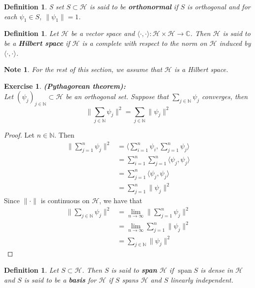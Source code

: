 \documentclass[12pt]{amsart}
\newtheorem{defn}[thm]{Definition}
\newtheorem{note}[thm]{Note}
\newtheorem{ex}[thm]{Exercise}
\renewcommand{\r}{\rangle}
\renewcommand{\l}{\langle}
\newcommand{\C}{\mathbb{C}}
\newcommand{\N}{\mathbb{N}}
\newcommand{\MH}{\mathcal{H}}
\newcommand{\limn}{\lim \limits_{n \rightarrow \infty}}
\DeclareMathOperator{\spn}{span}
\begin{document}
\begin{defn}
	S set $S \subset \MH$ is said to be \textbf{orthonormal} if $S$ is orthogonal and for each $\psi_1 \in S$, $\|\psi_1 \| = 1$.
\end{defn}

\begin{defn}
	Let $\MH$ be a vector space and $\l \cdot , \cdot\r: \MH \times \MH \rightarrow \C$. Then $\MH$ is said to be a \textbf{Hilbert space} if $\MH$ is a complete with respect to the norm on $\MH$ induced by $\l \cdot , \cdot \r$. 
\end{defn}

\begin{note}
	For the rest of this section, we assume that $\MH$ is a Hilbert space. 
\end{note}

\begin{ex}\textbf{(Pythagorean theorem):}\\
	Let $(\psi_j)_{j \in \N} \subset \MH$ be an orthogonal set. Suppose that $\sum\limits_{j \in \N} \psi_j$ converges, then $$\bigg \|\sum\limits_{j \in \N} \psi_j  \bigg \|^2 = \sum\limits_{j \in \N} \|\psi_j \|^2$$
\end{ex}

\begin{proof}
	Let $n \in \N$. Then 
	\begin{align*}
		\bigg \| \sum\limits_{j = 1}^n  \psi_j\bigg \|^2
		&= \bigg \l \sum\limits_{i =1}^n \psi_i , \sum\limits_{j =1}^n \psi_j \bigg \r \\
		&= \sum\limits_{i =1}^n \sum\limits_{j =1}^n \l \psi_j , \psi_j \r \\
		&= \sum\limits_{j =1}^n \l \psi_j , \psi_j \r \\
		&= \sum\limits_{j =1}^n \| \psi_j \|^2
	\end{align*}
	Since $\| \cdot \|$  is continuous on $\MH$, we have that 
	\begin{align*}
		\bigg \|\sum\limits_{j \in \N} \psi_j  \bigg \|^2
		&= \lim_{n \rightarrow \infty} \bigg \|\sum\limits_{j =1}^n \psi_j  \bigg \|^2 \\
		&= \limn \sum\limits_{j =1}^n \| \psi_j \|^2 \\
		&= \sum\limits_{j \in \N} \|\psi_j \|^2
	\end{align*}
\end{proof}

\begin{defn}
	Let $S \subset \MH$. Then $S$ is said to \textbf{span} $\MH$ if $\spn S$ is dense in $\MH$ and $S$ is said to be a \textbf{basis} for $\MH$ if $S$ spans $\MH$ and $S$ linearly independent.
\end{defn}
\end{document}
